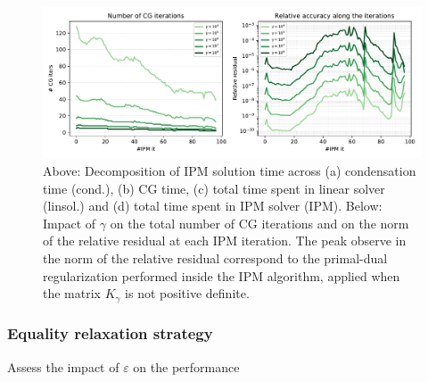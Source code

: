 \begin{figure}[!ht]
  \centering
  \includegraphics[width=\textwidth]{../figures/hybrid-gamma.pdf}
  \caption{
    Above: Decomposition of IPM solution time across
    (a) condensation time (cond.), (b) CG time, (c) total time
    spent in linear solver (linsol.) and (d) total time spent in
    IPM solver (IPM).
    Below: Impact of $\gamma$ on the total number of CG iterations
    and on the norm of the relative residual at each IPM iteration.
    The peak observe in the norm of the relative residual correspond
    to the primal-dual regularization performed inside the IPM algorithm,
    applied when the matrix $K_\gamma$ is not positive definite.
    \label{fig:hybrid:gamma}
  }
\end{figure}






\subsubsection{Equality relaxation strategy}
Assess the impact of $\varepsilon$ on the performance

